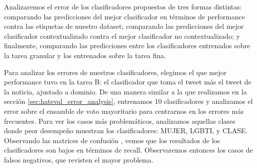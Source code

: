 Analizaremos el error de los clasificadores propuestos de tres formas distintas: comparando las predicciones del mejor clasificador en términos de performance contra las etiquetas de nuestro dataset; comparando las predicciones del mejor clasificador contextualizado contra el mejor clasificador no contextualizado; y finalmente, comparando las predicciones entre los clasificadores entrenados sobre la tarea granular y los entrenados sobre la tarea fina.

Para analizar los errores de nuestros clasificadores, elegimos el que mejor performance tuvo en la tarea B: el clasificador que toma el tweet más el tweet de la noticia, ajustado a dominio. De una manera similar a la que realizamos en la sección \ref{sec:hateval_error_analysis}, entrenamos 10 clasificadores y analizamos el error sobre el ensamble de voto mayoritario para centrarnos en los errores más frecuentes. Para ver los casos más problemáticos, analizamos aquellas clases donde peor desempeño muestran los clasificadores: MUJER, LGBTI, y CLASE. Observando las matrices de confusión , vemos que los resultados de los clasificadores son bajos en términos de recall. Observaremos entonces los casos de falsos negativos, que revisten el mayor problema.


